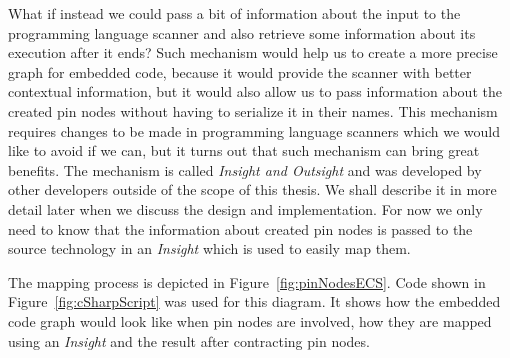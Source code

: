 \par
What if instead we could pass a bit of information about the input to the programming language scanner and also retrieve some information about its execution after it ends? Such mechanism would help us to create a more precise graph for embedded code, because it would provide the scanner with better contextual information, but it would also allow us to pass information about the created pin nodes without having to serialize it in their names. This mechanism requires changes to be made in programming language scanners which we would like to avoid if we can, but it turns out that such mechanism can bring great benefits. The mechanism is called \textit{Insight and Outsight} and was developed by other developers outside of the scope of this thesis. We shall describe it in more detail later when we discuss the design and implementation. For now we only need to know that the information about created pin nodes is passed to the source technology in an \textit{Insight} which is used to easily map them.
\par
The mapping process is depicted in Figure~\ref{fig:pinNodesECS}. Code shown in Figure~\ref{fig:cSharpScript} was used for this diagram. It shows how the embedded code graph would look like when pin nodes are involved, how they are mapped using an \textit{Insight} and the result after contracting pin nodes.

